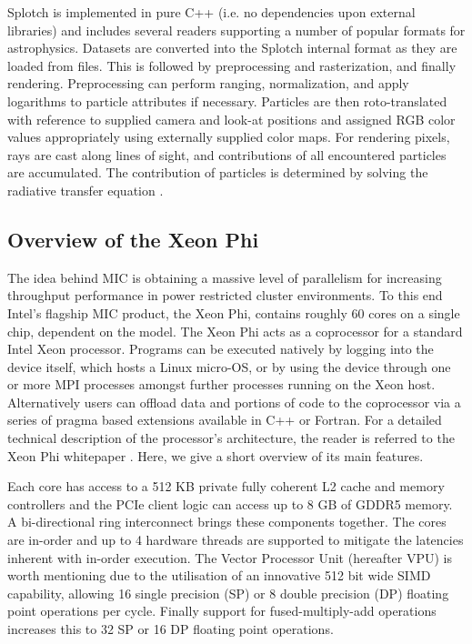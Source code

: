 \documentclass[runningheads,a4paper]{llncs}
\begin{document}
Splotch is implemented in pure C++ (i.e. no dependencies upon external libraries) and includes several readers 
supporting a number of popular formats for astrophysics. Datasets are converted into the Splotch internal format as they are 
loaded from files. This is followed by preprocessing and rasterization, and finally rendering. 
Preprocessing can perform ranging, normalization, 
and apply logarithms to particle attributes if necessary. Particles are then roto-translated with reference to supplied 
camera and look-at positions and assigned RGB color values appropriately using externally supplied color maps. For rendering 
pixels, rays are cast along lines of sight, and contributions of all encountered particles are accumulated. The contribution 
of particles is determined by solving the radiative transfer equation \cite{splotchgpu}.

\subsection{Overview of the Xeon Phi}
\label{sect:micoverview}

The idea behind MIC is obtaining a massive level of parallelism for increasing throughput performance in power restricted cluster 
environments. To this end Intel's flagship MIC product, the Xeon Phi, contains roughly 60 cores on a single chip, dependent on the 
model. The Xeon Phi acts as a coprocessor for a standard Intel Xeon processor. Programs can be executed natively by logging into 
the device itself, which hosts a Linux micro-OS, or by using the device through one or more MPI processes amongst further processes 
running on the Xeon host. Alternatively users can offload data and portions of code to the coprocessor via a series of pragma 
based extensions available in C++ or Fortran.
For a detailed technical description of the processor's architecture, the reader is referred to the
Xeon Phi whitepaper \cite{xeonphi}. Here, we give a short overview of its main features.

Each core has access to a 512 KB private fully coherent L2 cache and memory controllers
and the PCIe client logic can access up to 8 GB of GDDR5 memory. A bi-directional ring interconnect
brings these components together. The cores are in-order and up to 4 hardware threads are supported to mitigate
the latencies inherent with in-order execution. The Vector Processor Unit (hereafter VPU) is worth mentioning due to
the utilisation of an innovative 512 bit wide SIMD capability, allowing 16 single precision (SP) or 8 double precision
(DP) floating point operations per cycle. Finally support for fused-multiply-add operations increases this to 32 SP or 16 DP
floating point operations.
\end{document}
